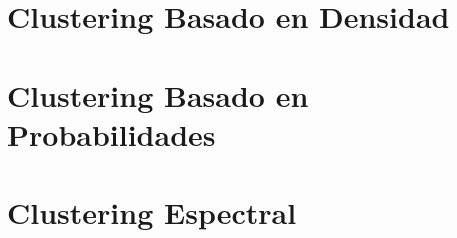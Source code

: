 \section{Clustering Basado en Densidad}\label{sec:Dbscan}


\section{Clustering Basado en Probabilidades}\label{sec:clusteringBasadoEnProbabilidades}


\section{Clustering Espectral}\label{sec:clusteringEspectral}

